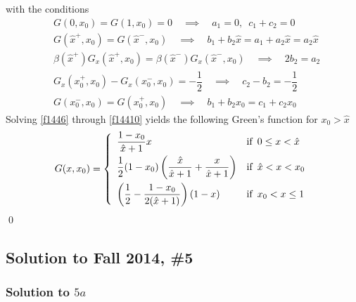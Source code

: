 with the conditions
\begin{align}
\label{f1446} &G(0,x_0) = G(1,x_0) = 0 \quad \implies \quad a_1 = 0, \,\,\, c_1 + c_2 = 0 \\
\label{f1447} &G(\hat{x}^+,x_0) = G(\hat{x}^-,x_0) \quad \implies \quad b_1 + b_2 \hat{x} = a_1 + a_2 \hat{x} = a_2 \hat{x} \\
\label{f1448} &\beta(\hat{x}^+)G_x(\hat{x}^+,x_0) = \beta(\hat{x}^-)G_x(\hat{x}^-,x_0) \quad \implies \quad 2b_2 = a_2 \\
\label{f1449} &G_x(x_0^+,x_0) - G_x(x_0^-, x_0) = -\dfrac{1}{2} \quad \implies \quad c_2 - b_2 = -\dfrac{1}{2} \\
\label{f14410} &G(x_0^-,x_0) = G(x_0^+,x_0) \quad \implies \quad b_1 + b_2 x_0 = c_1 + c_2 x_0
\end{align}
Solving \eqref{f1446} through \eqref{f14410} yields the following Green's function for $x_0 > \hat{x}$
$$ G(x,x_0) =
\left\{
\begin{array}{ll}
\dfrac{1-x_0}{\hat{x}+1} x & \text{if} \,\,\, 0 \leq x < \hat{x} \\ \asep
\dfrac{1}{2}(1-x_0) \left( \dfrac{\hat{x}}{\hat{x}+1} + \dfrac{x}{\hat{x}+1} \right) & \text{if} \,\,\, \hat{x} < x < x_0 \\ \asep
\left( \dfrac{1}{2} - \dfrac{1-x_0}{2(\hat{x}+1)}\right)(1-x) & \text{if} \,\,\, x_0 < x \leq 1
\end{array}
\right. $$ \hfill \qed




\subsection*{Solution to Fall 2014, \#5}
\label{F14Q5}

\subsubsection*{Solution to $5a$}

